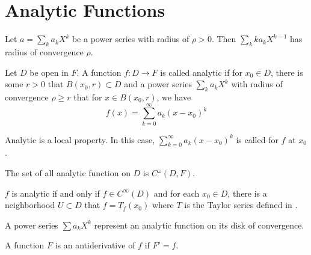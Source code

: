 \section{Analytic Functions}

\begin{theorem}
    Let $a = \sum_k a_k X^k$ be a power series with radius of $\rho > 0$. Then $\sum_k k a_k X^{k-1}$ has radius of convergence $\rho$.
\end{theorem}

\begin{definition}
    Let $D$ be open in $F$. A function $f: D \rightarrow F$ is called analytic if for $x_0 \in D$, there is some $r >0$ that $B(x_0, r) \subset D$ and a power series $\sum_k a_k X^k$ with radius of convergence $\rho \geq r$ that for $x \in B(x_0, r)$, we have
    \begin{equation}
        f(x) = \sum_{k=0}^\infty a_k (x - x_0)^k
    \end{equation}
    
    Analytic is a local property. In this case, $\sum_{k=0}^\infty a_k (x - x_0)^k$ is called  for $f$ at $x_0$. 
    
    The set of all analytic function on $D$ is $C^\omega (D,F)$.
\end{definition}

\begin{theorem}
    $f$ is analytic if and only if $f \in C^\infty(D)$ and for each $x_0 \in D$, there is a neighborhood $U \subset D$ that $f = T_f(x_0)$ where $T$ is the Taylor series defined in .
\end{theorem}

\begin{theorem}
    A power series $\sum a_k X^k$ represent an analytic function on its disk of convergence.
\end{theorem}

\begin{definition}
    A function $F$ is an antiderivative of $f$ if $F' = f$.
\end{definition}

